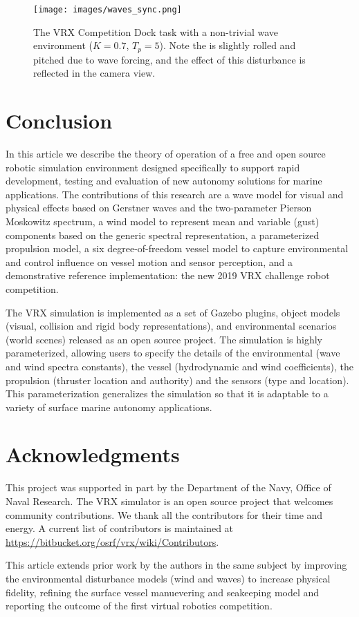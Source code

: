 \documentclass[utf8]{frontiersSCNS} %
\begin{document}
\begin{figure}[hbt!]
  \centering
  \texttt{[image: images/waves\_sync.png]}
  \caption{The VRX Competition Dock task with a non-trivial wave environment ($K = 0.7$, $T_p = 5$). Note the \wamv{} is slightly rolled and pitched due to wave forcing, and the effect of this disturbance is reflected in the camera view.}
  \label{f:dock_waves}
\end{figure}


\section{Conclusion}

In this article we describe the theory of operation of a free and open source robotic simulation environment designed specifically to support rapid development, testing and evaluation of new autonomy solutions for marine applications.  The contributions of this research are a wave model for visual and physical effects based on Gerstner waves and the two-parameter Pierson Moskowitz spectrum, a wind model to represent mean and variable (gust) components based on the generic spectral representation, a parameterized propulsion model, a six degree-of-freedom vessel model to capture environmental and control influence on vessel motion and sensor perception, and a demonstrative reference implementation: the new 2019 VRX challenge robot competition.

The VRX simulation is implemented as a set of Gazebo plugins, object models (visual, collision and rigid body representations), and environmental scenarios (world scenes) released as an open source project.  The simulation is highly parameterized, allowing users to specify the details of the environmental (wave and wind spectra constants), the vessel (hydrodynamic and wind coefficients), the propulsion (thruster location and authority) and the sensors (type and location). This parameterization generalizes the simulation so that it is adaptable to a variety of surface marine autonomy applications.


\section*{Acknowledgments}
This project was supported in part by the Department of the Navy, Office of Naval Research.  The VRX simulator is an open source project that welcomes community contributions.  We thank all the contributors for their time and energy.  A current list of contributors is maintained at \url{https://bitbucket.org/osrf/vrx/wiki/Contributors}.

This article extends prior work by the authors in the same subject \citep{bingham19toward} by improving the environmental disturbance models (wind and waves) to increase physical fidelity, refining the surface vessel manuevering and seakeeping model and reporting the outcome of the first virtual robotics competition.

 

\end{document}
